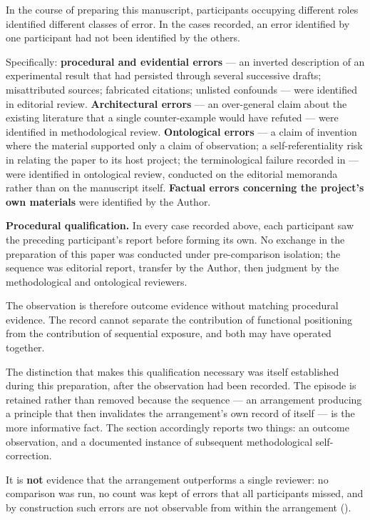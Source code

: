 In the course of preparing this manuscript, participants occupying different roles identified different classes of error. In the cases recorded, an error identified by one participant had not been identified by the others.

Specifically: \textbf{procedural and evidential errors} — an inverted description of an experimental result that had persisted through several successive drafts; misattributed sources; fabricated citations; unlisted confounds — were identified in editorial review. \textbf{Architectural errors} — an over-general claim about the existing literature that a single counter-example would have refuted — were identified in methodological review. \textbf{Ontological errors} — a claim of invention where the material supported only a claim of observation; a self-referentiality risk in relating the paper to its host project; the terminological failure recorded in  — were identified in ontological review, conducted on the editorial memoranda rather than on the manuscript itself. \textbf{Factual errors concerning the project's own materials} were identified by the Author.

\textbf{Procedural qualification.} In every case recorded above, each participant saw the preceding participant's report before forming its own. No exchange in the preparation of this paper was conducted under pre-comparison isolation; the sequence was editorial report, transfer by the Author, then judgment by the methodological and ontological reviewers.

The observation is therefore outcome evidence without matching procedural evidence. The record cannot separate the contribution of functional positioning from the contribution of sequential exposure, and both may have operated together.

The distinction that makes this qualification necessary was itself established during this preparation, after the observation had been recorded. The episode is retained rather than removed because the sequence — an arrangement producing a principle that then invalidates the arrangement's own record of itself — is the more informative fact. The section accordingly reports two things: an outcome observation, and a documented instance of subsequent methodological self-correction.

It is \textbf{not} evidence that the arrangement outperforms a single reviewer: no comparison was run, no count was kept of errors that all participants missed, and by construction such errors are not observable from within the arrangement ().

